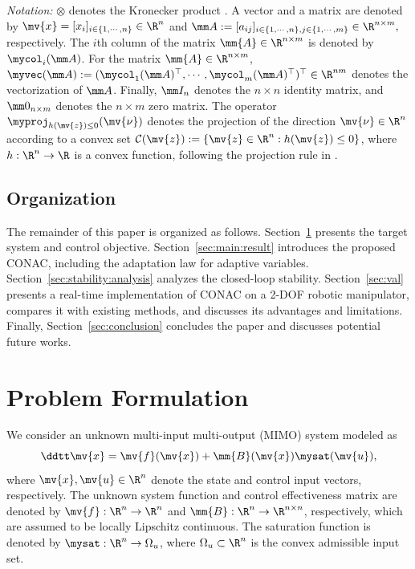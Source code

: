 \documentclass[letterpaper, journal]{IEEEtran}
\begin{document}
\noindent\textit{Notation:}
$\otimes$ denotes the Kronecker product \cite[Chap. 7, Def. 7.1.2]{Bernstein:2009aa}.
A vector and a matrix are denoted by $\mv{x}=[x_i]_{i\in\{1,\cdots,n\}}\in\R^n$ and 
$
  \mm A
  := 
  [a_{ij}]_{
    i\in\{1,\cdots,n\},j\in\{1,\cdots ,m\}
  }\in\R^{n\times m}
  ,
$
respectively.
The $i$th column of the matrix $\mm{A}\in\R^{n\times m}$ is denoted by $\mycol_i(\mm A)$.
For the matrix $\mm{A}\in\R^{n\times m}$, $\myvec(\mm A):=(\mycol_1(\mm A)^\top,\cdots,\mycol_m(\mm A)^\top )^\top\in\R^{nm}$ denotes the vectorization of $\mm A$.
Finally, $\mm I_n$ denotes the $n\times n$ identity matrix, and $\mm 0_{n\times m}$ denotes the $n\times m$ zero matrix.
The operator $\myproj_{h(\mv{z})\le 0}(\mv{\nu})$ denotes the projection of the direction $\mv{\nu}\in\R^n$ according to a convex set $\mathcal{C}(\mv{z}):=\left\{ \mv{z}\in\R^n: h(\mv{z})\le 0 \right\}$, where $h:\R^n\to\R$ is a convex function, following the projection rule in \cite[Appendix E, Eq. (E.4)]{Krstic:1995aa}.

\subsection{Organization}

The remainder of this paper is organized as follows. 
Section~\ref{sec:problem:formulation} presents the target system and control objective.
Section~\ref{sec:main:result} introduces the proposed CONAC, including the adaptation law for adaptive variables.
Section~\ref{sec:stability:analysis} analyzes the closed-loop stability.
Section~\ref{sec:val} presents a real-time implementation of CONAC on a 2-DOF robotic manipulator, compares it with existing methods, and discusses its advantages and limitations.
Finally, Section~\ref{sec:conclusion} concludes the paper and discusses potential future works.

\section{Problem Formulation} \label{sec:problem:formulation}

We consider an unknown multi-input multi-output (MIMO) system modeled as 
\begin{equation} \label{eq:sys}
  \ddtt\mv{x} 
  = 
  \mv{f}(\mv{x}) 
  + 
  \mm{B}(\mv{x})\mysat(\mv{u})
  ,
\end{equation}
where $\mv{x},\mv{u}\in\R^n$ denote the state and control input vectors, respectively.
The unknown system function and control effectiveness matrix are denoted by $\mv{f}:\R^n\to\R^n$ and $\mm{B}:\R^n\to\R^{n\times n}$, respectively, which are assumed to be locally Lipschitz continuous.
The saturation function is denoted by $\mysat:\R^n\to\Omega_u$, where $\Omega_u\subset\R^n$ is the convex admissible input set.
\end{document}
